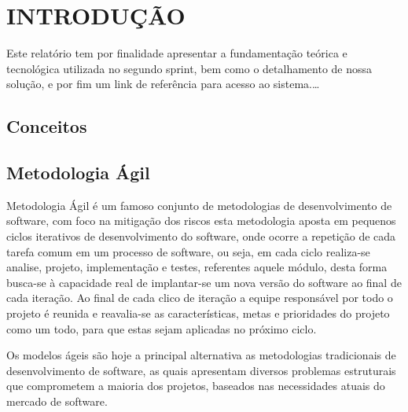 \documentclass{abnt}
\begin{document}





\capa

\folhaderosto

\tableofcontents


\chapter{INTRODUÇÃO}

	Este relatório tem por finalidade apresentar a fundamentação teórica e tecnológica utilizada no segundo sprint, bem como o detalhamento de nossa solução, e por fim um link de referência para acesso ao sistema.\ldots


	\section{Conceitos}
	\blindtext
	
	\section{Metodologia Ágil}
	
		Metodologia Ágil é um famoso conjunto de metodologias de desenvolvimento de software, 
		com foco na mitigação dos riscos esta metodologia aposta em pequenos ciclos iterativos de desenvolvimento do software,
		onde ocorre a repetição de cada tarefa comum em um processo de software, ou seja, em cada ciclo realiza-se analise, projeto,
		implementação e testes, referentes aquele módulo, desta forma busca-se à capacidade real de implantar-se um nova versão 
		do software ao final de cada iteração. Ao final de cada clico de iteração a equipe responsável por todo o projeto é reunida 
		e reavalia-se as características, metas e prioridades do projeto como um todo, para que estas sejam aplicadas no próximo ciclo.
		
		Os modelos ágeis são hoje a principal alternativa as metodologias tradicionais de desenvolvimento de software, 
		as quais apresentam diversos problemas estruturais que comprometem a maioria dos projetos, 
		baseados nas necessidades atuais do mercado de software.
	
\end{document}
